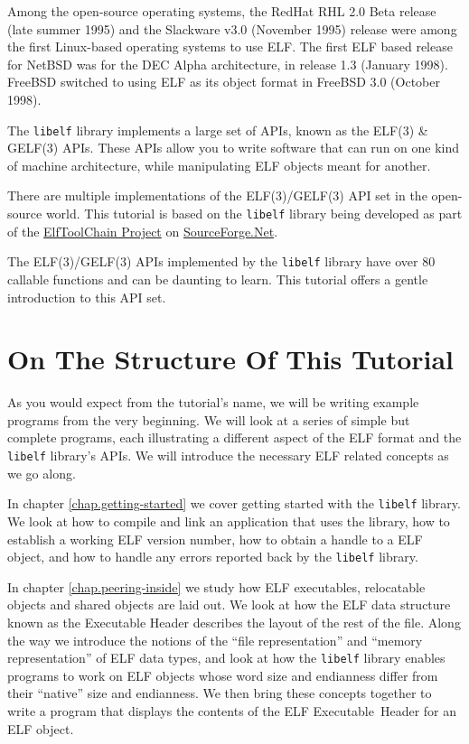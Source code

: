 \documentclass[a4paper,pdftex]{book}
\newcommand{\elftoolchainproject}{\href{https://elftoolchain.sourceforge.io/}%
    {ElfToolChain Project}\xspace}%
\newcommand{\library}[1]{\texttt{#1}}
\newcommand{\reg}{\textregistered\xspace}
\newcommand{\trade}{\texttrademark\xspace}
\newcommand{\elfdatastructure}[1]{\textsf{#1}}
\begin{document}
Among the open-source operating systems, the
RedHat\trade RHL 2.0 Beta release (late summer 1995) and the Slackware
v3.0 (November 1995) release were among the first Linux\reg-based
operating systems to use ELF.  The first ELF based release for
NetBSD\trade was for the DEC Alpha\trade architecture, in release 1.3
(January 1998).  FreeBSD\trade switched to using ELF as its object
format in FreeBSD 3.0 (October 1998).

The \library{libelf} library implements a large set of APIs, known as
the ELF(3) \& GELF(3) APIs.
These APIs allow you to write software that can run on one kind of
machine architecture, while manipulating ELF objects meant for
another.

There are multiple implementations of the ELF(3)/GELF(3) API set in
the open-source world.  This tutorial is based on the \library{libelf}
library being developed as part of the \elftoolchainproject on
\href{https://sourceforge.net/}{SourceForge.Net}.

The ELF(3)/GELF(3) APIs implemented by the \library{libelf} library
have over 80 callable functions and can be daunting to learn.  This
tutorial offers a gentle introduction to this API set.

\section{On The Structure Of This Tutorial}

As you would expect from the tutorial's name, we will be writing
example programs from the very beginning. We will look at a series of
simple but complete programs, each illustrating a different aspect of
the ELF format and the \library{libelf} library's APIs. We will
introduce the necessary ELF related concepts as we go along.

In chapter \vref{chap.getting-started} we cover getting started
with the \library{libelf} library. We look at how to compile and link
an application that uses the library, how to establish a working ELF
version number, how to obtain a handle to a ELF object, and how to
handle any errors reported back by the \library{libelf} library.

In chapter \vref{chap.peering-inside} we study how ELF executables,
relocatable objects and shared objects are laid out. We look at how
the ELF data structure known as the \elfdatastructure{Executable
  Header} describes the layout of the rest of
the file.  Along the way we introduce the notions of the ``file
representation'' and ``memory
representation'' of ELF data types, and
look at how the \library{libelf} library enables programs to work
on ELF objects whose word size and endianness differ from their
``native'' size and endianness. We then bring these concepts together
to write a program that displays the contents of the ELF
\elfdatastructure{Executable~Header} for an
ELF object.
\end{document}
